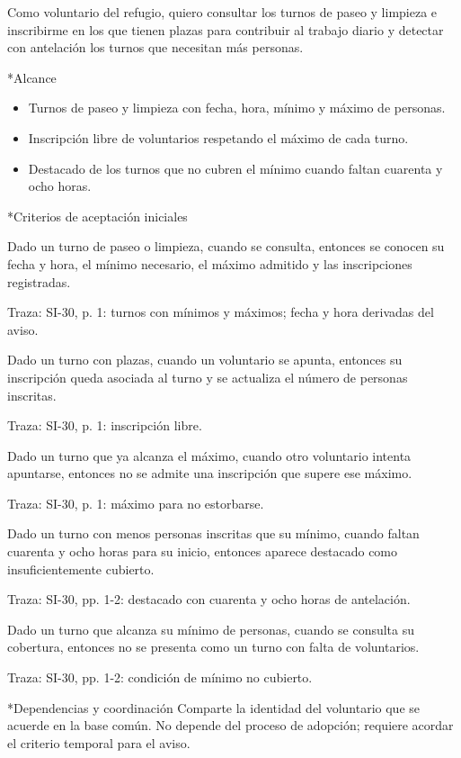 \documentclass[10pt,a4paper]{article}
\makeatletter
\newcommand{\apartado}{\@startsection{subsection}{2}{\z@}{7pt}{3pt}{\normalfont\normalsize\bfseries\color{verde}}*}
\newenvironment{criterios}{\begin{description}[style=nextline,leftmargin=0pt,labelsep=0pt,font=\bfseries\color{verde},itemsep=5pt,topsep=3pt,parsep=0pt]}{\end{description}}
\newcommand{\historia}[1]{\begingroup\setlength{\fboxsep}{10pt}\colorbox{suave}{\parbox{\dimexpr\linewidth-20pt\relax}{#1}}\endgroup}
\newcommand{\traza}[1]{{\footnotesize\color{gris}Traza: SI-30, #1.}}
\makeatother
\begin{document}
\historia{Como voluntario del refugio, quiero consultar los turnos de paseo y limpieza e inscribirme en los que tienen plazas para contribuir al trabajo diario y detectar con antelación los turnos que necesitan más personas.}
\apartado{Alcance}
\begin{itemize}
\item Turnos de paseo y limpieza con fecha, hora, mínimo y máximo de personas.
\item Inscripción libre de voluntarios respetando el máximo de cada turno.
\item Destacado de los turnos que no cubren el mínimo cuando faltan cuarenta y ocho horas.
\end{itemize}
\apartado{Criterios de aceptación iniciales}
\begin{criterios}
\item[CA-07-01] Dado un turno de paseo o limpieza, cuando se consulta, entonces se conocen su fecha y hora, el mínimo necesario, el máximo admitido y las inscripciones registradas.\par\traza{p. 1: turnos con mínimos y máximos; fecha y hora derivadas del aviso}
\item[CA-07-02] Dado un turno con plazas, cuando un voluntario se apunta, entonces su inscripción queda asociada al turno y se actualiza el número de personas inscritas.\par\traza{p. 1: inscripción libre}
\item[CA-07-03] Dado un turno que ya alcanza el máximo, cuando otro voluntario intenta apuntarse, entonces no se admite una inscripción que supere ese máximo.\par\traza{p. 1: máximo para no estorbarse}
\item[CA-07-04] Dado un turno con menos personas inscritas que su mínimo, cuando faltan cuarenta y ocho horas para su inicio, entonces aparece destacado como insuficientemente cubierto.\par\traza{pp. 1-2: destacado con cuarenta y ocho horas de antelación}
\item[CA-07-05] Dado un turno que alcanza su mínimo de personas, cuando se consulta su cobertura, entonces no se presenta como un turno con falta de voluntarios.\par\traza{pp. 1-2: condición de mínimo no cubierto}
\end{criterios}
\apartado{Dependencias y coordinación}
Comparte la identidad del voluntario que se acuerde en la base común. No depende del proceso de adopción; requiere acordar el criterio temporal para el aviso.
\end{document}
